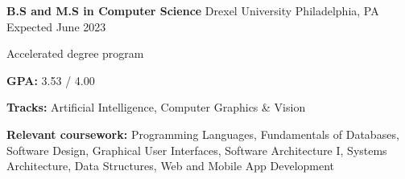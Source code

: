 

\begin{cventries}

  \cventry
  {\textbf{B.S and M.S in Computer Science}} %
  {Drexel University} %
  {Philadelphia, PA} %
  {Expected June 2023} %
  {
    \begin{cvitems} %
      \item {Accelerated degree program}
      \item {\textbf{GPA:} 3.53 / 4.00}
      \item {\textbf{Tracks:} Artificial Intelligence, Computer Graphics \& Vision}
      \item {\color{darktext} \textbf{Relevant coursework:}
        Programming Languages,
        Fundamentals of Databases,
        Software Design,
        Graphical User Interfaces,
        Software Architecture I,
        Systems Architecture,
        Data Structures,
        Web and Mobile App Development
      }
    \end{cvitems}
  } 

\end{cventries}
